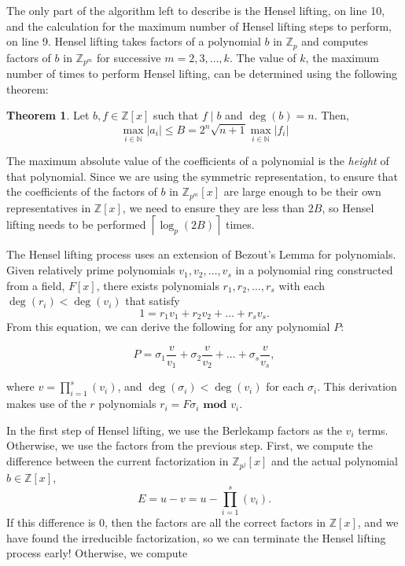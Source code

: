 \documentclass{article}
\theoremstyle{definition}
\newtheorem{thm}{Theorem}[section]
\begin{document}
The only part of the algorithm left to describe is the Hensel lifting, on line 10, and the calculation for the maximum number of Hensel lifting steps to perform, on line 9. Hensel lifting takes factors of a polynomial $b$ in $\mathbb{Z}_p$ and computes factors of $b$ in $\mathbb{Z}_{p^m}$ for successive $m = 2, 3, \ldots, k$. The value of $k$, the maximum number of times to perform Hensel lifting, can be determined using the following theorem:

\begin{thm}
    Let $b, f \in \mathbb{Z}[x]$ such that $f \mid b$ and $\deg(b) = n$. Then,
    \[ \max_{i \in \mathbb{N}} |a_i| \leq B = 2^n\sqrt{n+1}\max_{i \in \mathbb{N}} |f_i| \]
\end{thm}

The maximum absolute value of the coefficients of a polynomial is the \emph{height} of that polynomial. Since we are using the symmetric representation, to ensure that the coefficients of the factors of $b$ in $\mathbb{Z}_{p^m}[x]$ are large enough to be their own representatives in $\mathbb{Z}[x]$, we need to ensure they are less than $2B$, so Hensel lifting needs to be performed $\left\lceil \log_p(2B) \right\rceil$ times.

The Hensel lifting process uses an extension of Bezout's Lemma for polynomials. Given relatively prime polynomials $v_1, v_2, \ldots, v_s$ in a polynomial ring constructed from a field, $F[x]$, there exists polynomials $r_1, r_2, \ldots, r_s$ with each $\deg(r_i) < \deg(v_i)$ that satisfy \[1 = r_1{v_1}+r_2{v_2}+ \ldots +r_s{v_s}. \] From this equation, we can derive the following for any polynomial $P$:

\[P = \sigma_1\frac{v}{v_1}+\sigma_2\frac{v}{v_2}+ \ldots +\sigma_s\frac{v}{v_s}, \]

where $v = \prod_{i=1}^s(v_i)$, and $\deg(\sigma_i) < \deg(v_i)$ for each $\sigma_i$. This derivation makes use of the $r$ polynomials $r_i = F\sigma_i \textbf{ mod } v_i$.

In the first step of Hensel lifting, we use the Berlekamp factors as the $v_i$ terms. Otherwise, we use the factors from the previous step. First, we compute the difference between the current factorization in $\mathbb{Z}_{p^j}[x]$ and the actual polynomial $b \in \mathbb{Z}[x]$, \[E = u - v = u - \prod_{i=1}^s(v_i).\] If this difference is 0, then the factors are all the correct factors in $\mathbb{Z}[x]$, and we have found the irreducible factorization, so we can terminate the Hensel lifting process early! Otherwise, we compute
\end{document}
